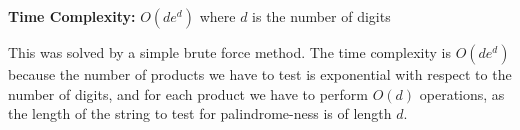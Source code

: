 \documentclass[12pt]{article}
\begin{document}
 
\noindent
\textbf{Time Complexity:} $O(de^d )$ where $d$ is the number of digits

\noindent
This was solved by a simple brute force method. The time complexity is $O(de^d)$ because the number of products we have to test is exponential with respect to the number of digits, and for each product we have to perform $O(d)$ operations, as the length of the string to test for palindrome-ness is of length $d$.
\end{document}
